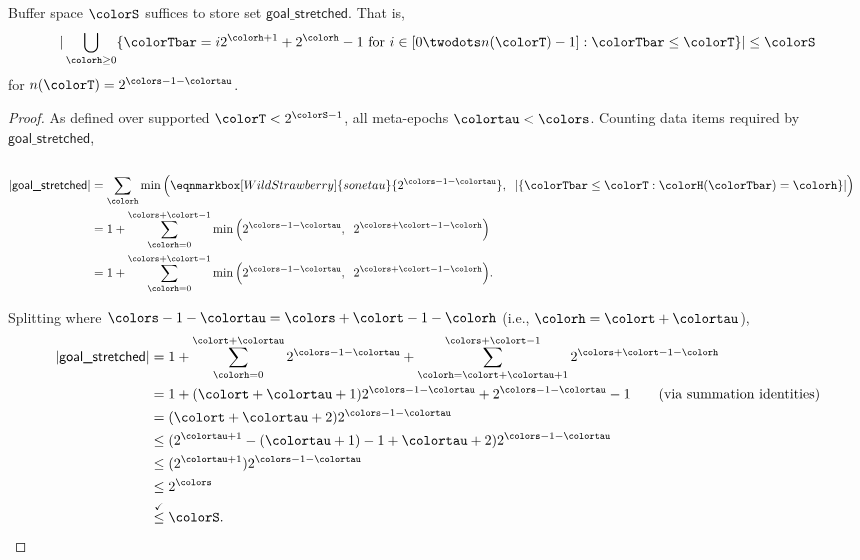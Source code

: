 \begin{lemma}
\label{thm:stretched-first-n-space}

Buffer space $\colorS$ suffices to store set $\textsf{goal\_stretched}$.
That is,
\begin{align*}
|\bigcup_{\colorh \geq 0}
\{ \colorTbar = i2^{\colorh + 1} + 2^{\colorh} - 1 \text{ for } i \in [0 \twodots n(\colorT) - 1] : \colorTbar \leq \colorT \}| \leq \colorS
\end{align*}
for $n(\colorT) = 2^{\colors - 1 - \colortau}$.
\end{lemma}
\begin{proof}
As defined over supported $\colorT < 2^{\colorS - 1}$, all meta-epochs $\colortau<\colors$.
Counting data items required by $\textsf{goal\_stretched}$,
\begin{align*}
\\
|\textsf{goal\_stretched}|
&=
\sum_{\colorh} \min\Big(
\eqnmarkbox[WildStrawberry]{sonetau}{2^{\colors - 1 - \colortau}},\;\; |\{ \colorTbar \leq \colorT : \colorH(\colorTbar) = \colorh \}|\Big)\\
&=
1 + \sum_{\colorh=0}^{\colors + \colort - 1} \min\Big(2^{\colors - 1 - \colortau},\;\; 2^{\colors + \colort - 1 - \colorh}\Big)\\
&=
1 + \sum_{\colorh=0}^{\colors + \colort - 1} \min\Big(2^{\colors - 1 - \colortau},\;\; 2^{\colors + \colort - 1 - \colorh}\Big).
\end{align*}

Splitting where $\colors - 1 - \colortau = \colors + \colort - 1 - \colorh$ (i.e., $\colorh = \colort + \colortau$),
\begin{align*}
|\textsf{goal\_stretched}|
&=
1 + \sum_{\colorh=0}^{\colort + \colortau} 2^{\colors - 1 - \colortau} + \sum_{\colorh=\colort + \colortau + 1}^{\colors + \colort - 1} 2^{\colors + \colort - 1 - \colorh}\\
&=
1 + (\colort + \colortau + 1) 2^{\colors - 1 - \colortau} + 2^{\colors - 1 - \colortau} - 1 \tag{via summation identities}\\
&=
(\colort + \colortau + 2) 2^{\colors - 1 - \colortau}\\
&\leq
(2^{\colortau + 1} - (\colortau + 1) - 1 + \colortau + 2) 2^{\colors - 1 - \colortau} \\
&\leq
(2^{\colortau + 1}) 2^{\colors - 1 - \colortau}\\
&\leq
2^{\colors}\\
&\stackrel{\checkmark}\leq
\colorS.
\end{align*}


\end{proof}
